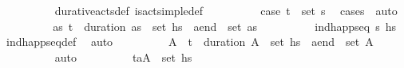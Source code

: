 \begin{isabellebody}
\ \ \ \ \ \ \ \ \isamarkupfalse%
\ durative{\isacharunderscore}{\kern0pt}acts{\isacharunderscore}{\kern0pt}def\ is{\isacharunderscore}{\kern0pt}act{\isacharunderscore}{\kern0pt}simple{\isacharunderscore}{\kern0pt}def\isanewline
\ \ \ \ \ \ \ \ \isamarkupfalse%
\ {\isacartoucheopen}{\isacharquery}{\kern0pt}case{}{\isacartoucheclose}\ {\isacartoucheopen}{\isacharparenleft}{\kern0pt}t\isactrlsub {\isasympi}{\isacharcomma}{\kern0pt}{\isasympi}{\isacharparenright}{\kern0pt}\ {\isasymin}\ set\ {\isasympi}s{\isacartoucheclose}\ \isamarkupfalse%
\ {\isacharparenleft}{\kern0pt}cases\ {\isasympi}{\isacharparenright}{\kern0pt}\ auto\isanewline
\ \ \ \ \ \ \isamarkupfalse%
\ \isamarkupfalse%
\ {\isachardoublequoteopen}{\isasymexists}as{\isachardot}{\kern0pt}\ {\isacharparenleft}{\kern0pt}t\isactrlsub {\isasympi}\ {\isacharplus}{\kern0pt}\ {\isacharparenleft}{\kern0pt}duration\ {\isasympi}{\isacharparenright}{\kern0pt}{\isacharcomma}{\kern0pt}as{\isacharparenright}{\kern0pt}\ {\isasymin}\ set\ hs\ {\isasymand}\ {\isacharquery}{\kern0pt}a\isactrlsub e\isactrlsub n\isactrlsub d\ {\isasymin}\ set\ as{\isachardoublequoteclose}\isanewline
\ \ \ \ \ \ \ \ \isamarkupfalse%
\ {\isacartoucheopen}ind{\isacharunderscore}{\kern0pt}happ{\isacharunderscore}{\kern0pt}seq\ {\isasympi}s\ hs\ \isamarkupfalse%
\ ind{\isacharunderscore}{\kern0pt}happ{\isacharunderscore}{\kern0pt}seq{\isacharunderscore}{\kern0pt}def\ \isamarkupfalse%
\ auto\isanewline
\ \ \ \ \ \ \isamarkupfalse%
\ \isamarkupfalse%
\ A{\isacharprime}{\kern0pt}\ \ {\isachardoublequoteopen}{\isacharparenleft}{\kern0pt}t\isactrlsub {\isasympi}\ {\isacharplus}{\kern0pt}\ {\isacharparenleft}{\kern0pt}duration\ {\isasympi}{\isacharparenright}{\kern0pt}{\isacharcomma}{\kern0pt}A{\isacharprime}{\kern0pt}{\isacharparenright}{\kern0pt}\ {\isasymin}\ set\ hs\ \ {\isachardoublequoteopen}{\isacharquery}{\kern0pt}a\isactrlsub e\isactrlsub n\isactrlsub d\ {\isasymin}\ set\ A{\isacharprime}{\kern0pt}{\isachardoublequoteclose}\ \isanewline
\ \ \ \ \ \ \ \ \isamarkupfalse%
\ auto\isanewline
\ \ \ \ \ \ \isamarkupfalse%
\ \isamarkupfalse%
\ {\isachardoublequoteopen}{\isacharparenleft}{\kern0pt}t\isactrlsub a{\isacharcomma}{\kern0pt}A{\isacharprime}{\kern0pt}{\isacharparenright}{\kern0pt}\ {\isasymin}\ set\ hs\isanewline

\end{isabellebody}
